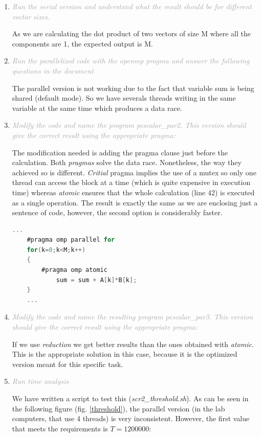 \documentclass{article}
\newcommand{\greyItem}[1]{\item\emph{\textcolor{darkgray}{#1}}}
\begin{document}
\begin{enumerate}[label=2.\arabic*,leftmargin=*]

\greyItem{Run the serial version and understand what the result should be for different vector sizes.} 
    
As we are calculating the dot product of two vectors of size M where all the components are 1, the expected output is M.
    
\greyItem{Run the parallelized code with the openmp pragma and answer the following questions in the document}
    
The parallel version is not working due to the fact that variable sum is being shared (default mode). So we have severals threads writing in the same variable at the same time which produces a data race.

\greyItem{Modify the code and name the program pescalar\_par2. This version should give the correct result using the appropriate pragma:}

The modification needed is adding the pragma clause just before the calculation.
Both \emph{pragmas} solve the data race. Nonetheless, the way they achieved so is different. \emph{Critial} pragma implies the use of a mutex so only one thread can access the block at a time (which is quite expensive in execution time) whereas \emph{atomic} ensures that the whole calculation (line 42) is executed as a single operation. The result is exactly the same as we are enclosing just a sentence of code, however, the second option is considerably faster.

\begin{lstlisting}[language=C, texcl=true]
    ...
    #pragma omp parallel for 
    for(k=0;k<M;k++)
    {	
        #pragma omp atomic
            sum = sum + A[k]*B[k];
    } 
    ...
\end{lstlisting}

\greyItem{Modify the code and name the resulting program pescalar\_par3. This version should give the correct result using the appropriate pragma: }

If we use \emph{reduction} we get better results than the ones obtained with \emph{atomic}. This is the appropriate solution in this case, because it is the optimized version meant for this specific task.

\greyItem{Run time analysis}

We have written a script to test this (\emph{scr2\_threshold.sh}). As can be seen in the following figure (fig. \ref{threshold}), the parallel version (in the lab computers, that use 4 threads) is very inconsistent. However, the first value that meets the requirements is $T=1200000$:


\end{enumerate}
\end{document}
